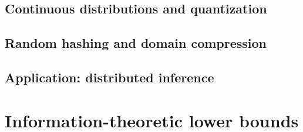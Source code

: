 \documentclass[biber]{nowfnt} %
\begin{document}
\section{Continuous distributions and quantization}
\section{Random hashing and domain compression}
  \label{sec:domain:compression}
\section{Application: distributed inference}

\chapter{Information-theoretic lower bounds}
  \label{chap:lowerbounds}


%
%
%
%
\end{document}
